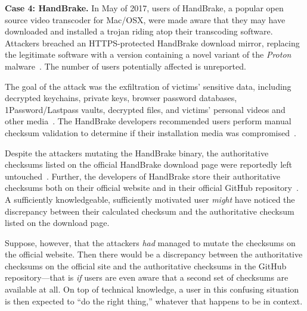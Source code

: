 \noindent\textbf{Case 4: HandBrake.} In May of 2017, users of HandBrake, a
popular open source video transcoder for Mac/OSX, were made aware that they may
have downloaded and installed a trojan riding atop their transcoding software.
Attackers breached an HTTPS-protected HandBrake download mirror, replacing the
legitimate software with a version containing a novel variant of the
\emph{Proton} malware~\cite{SCA-HB1}. The number of users potentially affected
is unreported.

The goal of the attack was the exfiltration of victims' sensitive data,
including decrypted keychains, private keys, browser password databases,
1Password/Lastpass vaults, decrypted files, and victims' personal videos and
other media~\cite{SCA-HB1}. The HandBrake developers recommended users perform
manual checksum validation to determine if their installation media was
compromised~\cite{SCA-HB2}.

Despite the attackers mutating the HandBrake binary, the authoritative checksums
listed on the official HandBrake download page were reportedly left
untouched~\cite{SCA-HB2}. Further, the developers of HandBrake store their
authoritative checksums both on their official website and in their official
GitHub repository~\cite{SCA-HB2}. A sufficiently knowledgeable, sufficiently
motivated user \emph{might} have noticed the discrepancy between their
calculated checksum and the authoritative checksum listed on the download page.

Suppose, however, that the attackers \textit{had} managed to mutate the
checksums on the official website. Then there would be a discrepancy between the
authoritative checksums on the official site and the authoritative checksums in
the GitHub repository---that is \emph{if} users are even aware that a second set
of checksums are available at all. On top of technical knowledge, a user in this
confusing situation is then expected to ``do the right thing,'' whatever that
happens to be in context.
